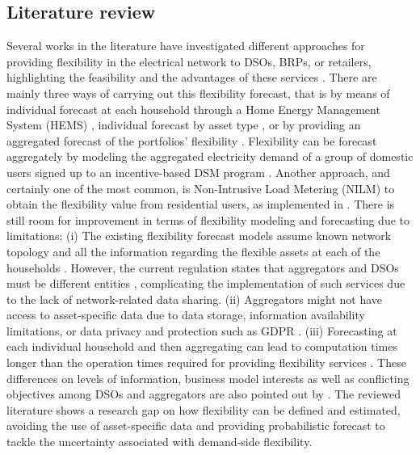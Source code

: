 \subsection{Literature review}
Several works in the literature have investigated different approaches for providing flexibility in the electrical network to DSOs, BRPs, or retailers, highlighting the feasibility and the advantages of these services \cite{Huber2020, Bodal2017, Gorria2013, Pinto2017,Lucas2019, Yue2020}. There are mainly three ways of carrying out this flexibility forecast, that is by means of individual forecast at each household through a Home Energy Management System (HEMS) \cite{Pinto2017}, individual forecast by asset type \cite{Huber2020}, or by providing an aggregated forecast of the portfolios' flexibility \cite{Bodal2017}. Flexibility can be forecast aggregately by modeling the aggregated electricity demand of a group of domestic users signed up to an incentive-based DSM program \cite{Gorria2013}. Another approach, and certainly one of the most common, is Non-Intrusive Load Metering (NILM) to obtain the flexibility value from residential users, as implemented in  \cite{Lucas2019, Yue2020}. %
There is still room for improvement in terms of flexibility modeling and forecasting due to limitations: (i) The existing flexibility forecast models assume known network topology and all the information regarding the flexible assets at each of the households \cite{Pinto2017, Gorria2013}. However, the current regulation states that aggregators and DSOs must be different entities \cite{Guldbaek2017, BEUC2018, EuropeanParliament2019}, complicating the implementation of such services due to the lack of network-related data sharing. (ii) Aggregators might not have access to asset-specific data due to data storage, information availability limitations, or data privacy and protection such as GDPR \cite{GDPR1, GDPR2}. (iii) Forecasting at each individual household and then aggregating can lead to computation times longer than the operation times required for providing flexibility services \cite{Olivella2020}. These differences on levels of information, business model interests as well as conflicting objectives among DSOs and aggregators are also pointed out by \cite{Heinrich2020}. The reviewed literature shows a research gap on how flexibility can be defined and estimated, avoiding the use of asset-specific data and providing probabilistic forecast to tackle the uncertainty associated with demand-side flexibility.

